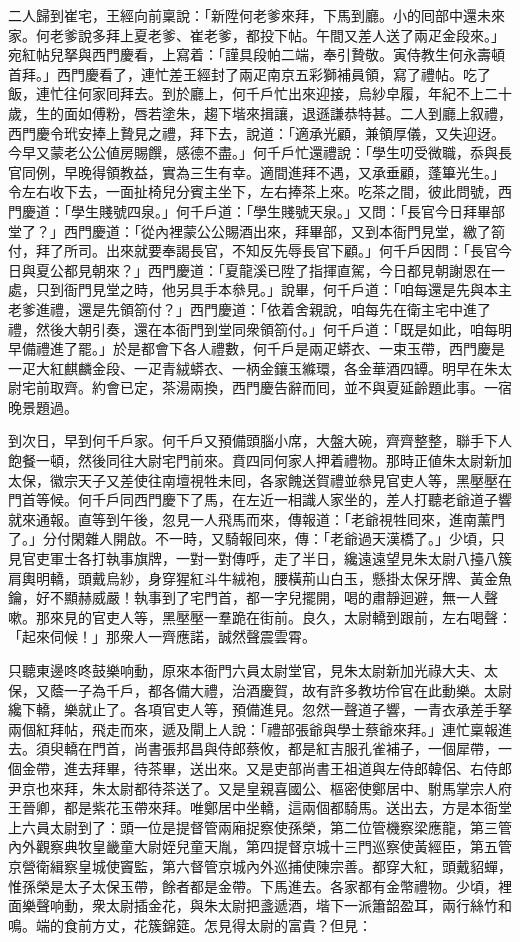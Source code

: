 二人歸到崔宅，王經向前稟說：「新陞何老爹來拜，下馬到廳。小的囘部中還未來家。何老爹說多拜上夏老爹、崔老爹，都投下帖。午間又差人送了兩疋金段來。」宛紅帖兒拏與西門慶看，上寫着：「謹具段帕二端，奉引贄敬。寅侍教生何永壽頓首拜。」西門慶看了，連忙差王經封了兩疋南京五彩獅補員領，寫了禮帖。吃了飯，連忙往何家囘拜去。到於廳上，何千戶忙出來迎接，烏紗皁履，年紀不上二十歲，生的面如傅粉，唇若塗朱，趨下堦來揖讓，退遜謙恭特甚。二人到廳上叙禮，西門慶令玳安捧上贄見之禮，拜下去，說道：「適承光顧，兼領厚儀，又失迎迓。今早又蒙老公公値房賜饌，感德不盡。」何千戶忙還禮說：「學生叨受微職，忝與長官同例，早晚得領教益，實為三生有幸。適間進拜不遇，又承垂顧，蓬篳光生。」令左右收下去，一面扯椅兒分賓主坐下，左右捧茶上來。吃茶之間，彼此問號，西門慶道：「學生賤號四泉。」何千戶道：「學生賤號天泉。」又問：「長官今日拜畢部堂了？」西門慶道：「從內裡蒙公公賜酒出來，拜畢部，又到本衙門見堂，繳了箚付，拜了所司。出來就要奉謁長官，不知反先辱長官下顧。」何千戶因問：「長官今日與夏公都見朝來？」西門慶道：「夏龍溪已陞了指揮直駕，今日都見朝謝恩在一處，只到衙門見堂之時，他另具手本叅見。」說畢，何千戶道：「咱每還是先與本主老爹進禮，還是先領箚付？」西門慶道：「依着舍親說，咱每先在衛主宅中進了禮，然後大朝引奏，還在本衙門到堂同衆領箚付。」何千戶道：「既是如此，咱每明早備禮進了罷。」於是都會下各人禮數，何千戶是兩疋蟒衣、一束玉帶，西門慶是一疋大紅麒麟金段、一疋青絨蟒衣、一柄金鑲玉縧環，各金華酒四罈。明早在朱太尉宅前取齊。約會已定，茶湯兩換，西門慶告辭而囘，並不與夏延齡題此事。一宿晚景題過。

到次日，早到何千戶家。何千戶又預備頭腦小席，大盤大碗，齊齊整整，聯手下人飽餐一頓，然後同往大尉宅門前來。賁四同何家人押着禮物。那時正値朱太尉新加太保，徽宗天子又差使往南壇視牲未囘，各家餽送賀禮並叅見官吏人等，黑壓壓在門首等候。何千戶同西門慶下了馬，在左近一相識人家坐的，差人打聽老爺道子響就來通報。直等到午後，忽見一人飛馬而來，傳報道：「老爺視牲囘來，進南薰門了。」分付閑雜人開啟。不一時，又騎報囘來，傳：「老爺過天漢橋了。」少頃，只見官吏軍士各打執事旗牌，一對一對傳呼，走了半日，纔遠遠望見朱太尉八擡八簇肩輿明轎，頭戴烏紗，身穿猩紅斗牛絨袍，腰橫荊山白玉，懸掛太保牙牌、黃金魚鑰，好不顯赫威嚴！執事到了宅門首，都一字兒擺開，喝的肅靜迴避，無一人聲嗽。那來見的官吏人等，黑壓壓一羣跪在街前。良久，太尉轎到跟前，左右喝聲：「起來伺候！」那衆人一齊應諾，誠然聲震雲霄。

只聽東邊咚咚鼓樂响動，原來本衙門六員太尉堂官，見朱太尉新加光祿大夫、太保，又蔭一子為千戶，都各備大禮，治酒慶賀，故有許多教坊伶官在此動樂。太尉纔下轎，樂就止了。各項官吏人等，預備進見。忽然一聲道子響，一青衣承差手拏兩個紅拜帖，飛走而來，遞及閘上人說：「禮部張爺與學士蔡爺來拜。」連忙稟報進去。須臾轎在門首，尚書張邦昌與侍郎蔡攸，都是紅吉服孔雀補子，一個犀帶，一個金帶，進去拜畢，待茶畢，送出來。又是吏部尚書王祖道與左侍郎韓侶、右侍郎尹京也來拜，朱太尉都待茶送了。又是皇親喜國公、樞密使鄭居中、駙馬掌宗人府王晉卿，都是紫花玉帶來拜。唯鄭居中坐轎，這兩個都騎馬。送出去，方是本衙堂上六員太尉到了：頭一位是提督管兩廂捉察使孫榮，第二位管機察梁應龍，第三管內外觀察典牧皇畿童大尉姪兒童天胤，第四提督京城十三門巡察使黃經臣，第五管京營衛緝察皇城使竇監，第六督管京城內外巡捕使陳宗善。都穿大紅，頭戴貂蟬，惟孫榮是太子太保玉帶，餘者都是金帶。下馬進去。各家都有金幣禮物。{}少頃，裡面樂聲响動，衆太尉插金花，與朱太尉把盞遞酒，堦下一派簫韶盈耳，兩行絲竹和鳴。端的食前方丈，花簇錦筵。怎見得太尉的富貴？但見：

